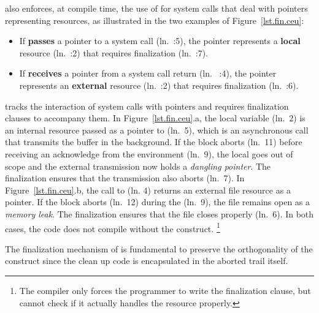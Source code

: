 \CEU also enforces, at compile time, the use of  for system
calls that deal with pointers representing resources, as illustrated in the two
examples of Figure~\ref{lst.fin.ceu}:
%
\begin{itemize}
    \item If \CEU \textbf{passes} a pointer to a system call (ln.~\ax:5), the
          pointer represents a \textbf{local} resource (ln.~\ax:2) that
          requires finalization (ln.~\ax:7).
    \item If \CEU \textbf{receives} a pointer from a system call return
          (ln.~ \bx:4), the pointer represents an \textbf{external} resource
          (ln.~\bx:2) that requires finalization (ln.~\bx:6).
\end{itemize}
%
\CEU tracks the interaction of system calls with pointers and requires
finalization clauses to accompany them.
%
In Figure~\ref{lst.fin.ceu}.a, the local variable 
(ln.~2) is an internal resource passed as a pointer to  (ln.~5),
which is an asynchronous call that transmits the buffer in the background.
If the block aborts (ln.~11) before receiving an acknowledge from the
environment (ln.~9), the local  goes out of scope and the external
transmission now holds a \emph{dangling pointer}.
The finalization ensures that the transmission also aborts (ln.~7).
%
In Figure~\ref{lst.fin.ceu}.b, the call to  (ln.
4) returns an external file resource as a pointer.
If the block aborts (ln.~12) during the  (ln.~9), the file
remains open as a \emph{memory leak}.
The finalization ensures that the file closes properly (ln.~6).
%
In both cases, the code does not compile without the 
construct.%
\footnote{%
The compiler only forces the programmer to write the finalization clause, but
cannot check if it actually handles the resource properly.
}

The finalization mechanism of \CEU is fundamental to preserve the orthogonality
of the  construct since the clean up code is encapsulated in the
aborted trail itself.
